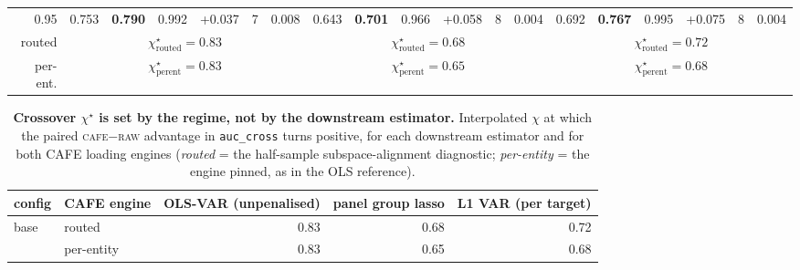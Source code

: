 \begin{table}[t]
\begin{tabular}{r|rrrr@{\ }r@{\ }r|rrrr@{\ }r@{\ }r|rrrr@{\ }r@{\ }r}
0.95 & 0.753 & \textbf{0.790} & 0.992 & +0.037 & 7 & 0.008 & 0.643 & \textbf{0.701} & 0.966 & +0.058 & 8 & 0.004 & 0.692 & \textbf{0.767} & 0.995 & +0.075 & 8 & 0.004 \\
\cmidrule{2-19}
\multicolumn{1}{r|}{routed} & \multicolumn{6}{c}{$\chi^\star_{\mathrm{routed}}=0.83$} & \multicolumn{6}{c}{$\chi^\star_{\mathrm{routed}}=0.68$} & \multicolumn{6}{c}{$\chi^\star_{\mathrm{routed}}=0.72$} \\
\multicolumn{1}{r|}{per-ent.} & \multicolumn{6}{c}{$\chi^\star_{\mathrm{perent}}=0.83$} & \multicolumn{6}{c}{$\chi^\star_{\mathrm{perent}}=0.65$} & \multicolumn{6}{c}{$\chi^\star_{\mathrm{perent}}=0.68$} \\
\bottomrule
\end{tabular}
\end{table}

\begin{table}[t]\centering\small
\caption{\textbf{Crossover $\chi^\star$ is set by the regime, not by the downstream estimator.} Interpolated $\chi$ at which the paired \textsc{cafe}$-$\textsc{raw} advantage in \texttt{auc\_cross} turns positive, for each downstream estimator and for both CAFE loading engines (\emph{routed} = the half-sample subspace-alignment diagnostic; \emph{per-entity} = the engine pinned, as in the OLS reference).}
\label{tab:causalsparsegatecross}
\begin{tabular}{llrrr}
\toprule
config & CAFE engine & OLS-VAR (unpenalised) & panel group lasso & L1 VAR (per target) \\
\midrule
base & routed & 0.83 & 0.68 & 0.72 \\
 & per-entity & 0.83 & 0.65 & 0.68 \\
\bottomrule
\end{tabular}
\end{table}
